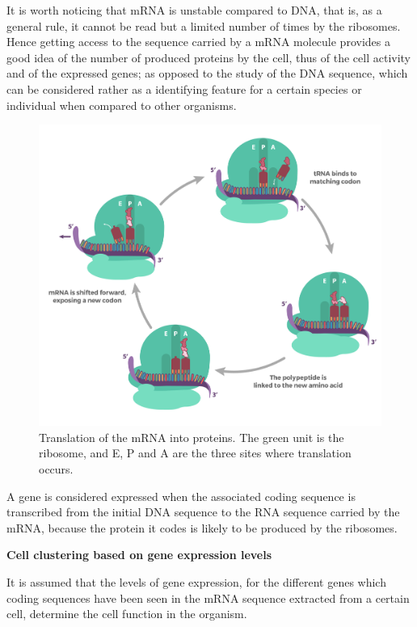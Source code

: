 \documentclass{report}
\begin{document}
It is worth noticing that mRNA is unstable\cite{brenner1961unstable} compared to DNA, that is, as a general rule, it cannot be read but a limited number of times by the ribosomes. Hence getting access to the sequence carried by a mRNA molecule provides a good idea of the number of produced proteins by the cell, thus of the cell activity and of the expressed genes; as opposed to the study of the DNA sequence, which can be considered rather as a identifying feature for a certain species or individual when compared to other organisms.\\ 

\begin{figure}[H]
\centering
\includegraphics[scale=0.5]{illustrations/translation.png}
\caption{Translation of the mRNA into proteins. The green unit is the ribosome, and E, P and A are the three sites where translation occurs.}
\label{translation}
\end{figure}

A gene is considered expressed when the associated coding sequence is transcribed from the initial DNA sequence to the RNA sequence carried by the mRNA, because the protein it codes is likely to be produced by the ribosomes. 

\bigskip
\noindent \textbf{Cell clustering based on gene expression levels}
\bigskip

It is assumed that the levels of gene expression, for the different genes which coding sequences have been seen in the mRNA sequence extracted from a certain cell, determine the cell function in the organism.\\
\end{document}
